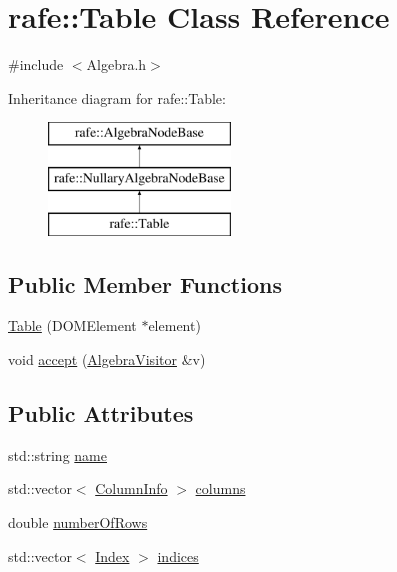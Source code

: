\hypertarget{classrafe_1_1_table}{\section{rafe\+:\+:Table Class Reference}
\label{classrafe_1_1_table}
}


{\ttfamily \#include $<$Algebra.\+h$>$}

Inheritance diagram for rafe\+:\+:Table\+:\begin{figure}[H]
\begin{center}
\leavevmode
\includegraphics[height=3.000000cm]{classrafe_1_1_table}
\end{center}
\end{figure}
\subsection*{Public Member Functions}
\begin{DoxyCompactItemize}
\item 
\hyperlink{classrafe_1_1_table_ae9d43a7f2832cf18bf9553904a959df0}{Table} (D\+O\+M\+Element $\ast$element)
\item 
void \hyperlink{classrafe_1_1_table_a2a807fb6c8921673ba7adb62dd0a9f7c}{accept} (\hyperlink{classrafe_1_1_algebra_visitor}{Algebra\+Visitor} \&v)
\end{DoxyCompactItemize}
\subsection*{Public Attributes}
\begin{DoxyCompactItemize}
\item 
std\+::string \hyperlink{classrafe_1_1_table_a398b089bc1b42a3ca61c21ebda706cc4}{name}
\item 
std\+::vector$<$ \hyperlink{classrafe_1_1_column_info}{Column\+Info} $>$ \hyperlink{classrafe_1_1_table_af3a4fb3f52ae24f09a1073c27bd79a6a}{columns}
\item 
double \hyperlink{classrafe_1_1_table_aa9c9eecf04e1203cc1f6ac25ecbd2baa}{number\+Of\+Rows}
\item 
std\+::vector$<$ \hyperlink{classrafe_1_1_index}{Index} $>$ \hyperlink{classrafe_1_1_table_aaad0b0fba6c76335a428b7e38df992b4}{indices}
\end{DoxyCompactItemize}


